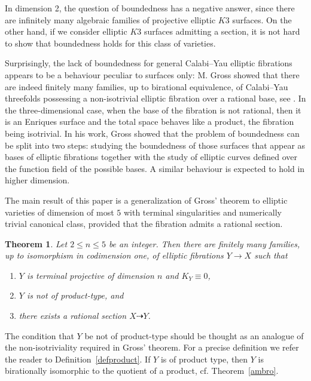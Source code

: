 \documentclass{amsart}[12pt,a4paper]
\newtheorem{theorem}{Theorem}[section]
\theoremstyle{definition}
\begin{document}
In dimension 2, the question of boundedness has a negative answer, since there are infinitely many algebraic families of projective elliptic $K3$ surfaces. 
On the other hand, if we consider elliptic $K3$ surfaces admitting a section, it is not hard to show that boundedness holds for this class of varieties.

Surprisingly, the lack of boundedness for general Calabi--Yau elliptic fibrations appears to be a behaviour peculiar to surfaces only: M. Gross showed that there are indeed finitely many families, up to birational equivalence, of Calabi--Yau threefolds possessing a non-isotrivial elliptic fibration over a rational base, see \cite{Gross}.
In the three-dimensional case, when the base of the fibration is not rational, then it is an Enriques surface and the total space behaves like a product, the fibration being isotrivial. 
In his work, Gross showed that the problem of boundedness can be split into two steps: studying the boundedness of those surfaces that appear as bases of elliptic fibrations together with the study of elliptic curves defined over the function field of the possible bases. 
A similar behaviour is expected to hold in higher dimension.

The main result of this paper is a generalization of Gross' theorem to elliptic varieties of dimension of most $5$ with terminal singularities and numerically trivial canonical class, provided that the fibration admits a rational section.

\begin{theorem}
\label{elliptic}
Let $2\leq n\leq 5$ be an integer. Then there are finitely many families, up to isomorphism in codimension one, of elliptic fibrations $Y\rightarrow X$ such that
\begin{enumerate}
\item  $Y$ is terminal projective of dimension $n$ and $K_Y \equiv 0$,
\item $Y$ is not of product-type, and
\item there exists a rational section $X\dashrightarrow Y$.
\end{enumerate}
\end{theorem}

The condition that $Y$ be not of product-type should be thought as an analogue of the non-isotriviality required in Gross' theorem. 
For a precise definition we refer the reader to Definition~\ref{defproduct}. 
If $Y$ is of product type, then $Y$ is birationally isomorphic to the quotient of a product, cf. Theorem~\ref{ambro}.
\end{document}
